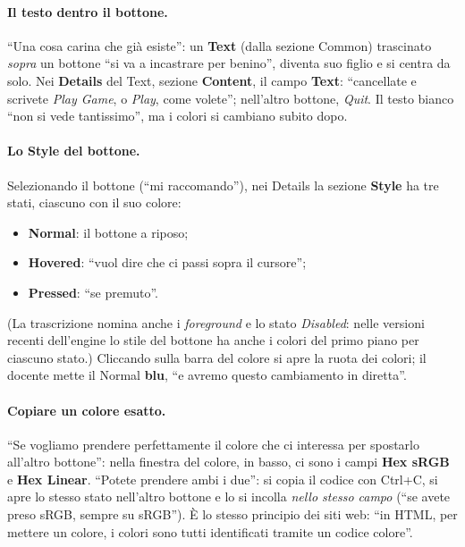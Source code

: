 \paragraph{Il testo dentro il bottone.} ``Una cosa carina che già esiste'': un
\textbf{Text} (dalla sezione Common) trascinato \emph{sopra} un bottone ``si va a incastrare
per benino'', diventa suo figlio e si centra da solo. Nei \textbf{Details} del Text, sezione
\textbf{Content}, il campo \textbf{Text}: ``cancellate e scrivete \emph{Play Game}, o
\emph{Play}, come volete''; nell'altro bottone, \emph{Quit}. Il testo bianco ``non si vede
tantissimo'', ma i colori si cambiano subito dopo.

\paragraph{Lo Style del bottone.} Selezionando il bottone (``mi raccomando''), nei Details
la sezione \textbf{Style} ha tre stati, ciascuno con il suo colore:
\begin{itemize}
  \item \textbf{Normal}: il bottone a riposo;
  \item \textbf{Hovered}: ``vuol dire che ci passi sopra il cursore'';
  \item \textbf{Pressed}: ``se premuto''.
\end{itemize}
(La trascrizione nomina anche i \emph{foreground} e lo stato \emph{Disabled}: nelle
versioni recenti dell'engine lo stile del bottone ha anche i colori del primo piano per
ciascuno stato.) Cliccando sulla barra del colore si apre la ruota dei colori; il docente
mette il Normal \textbf{blu}, ``e avremo questo cambiamento in diretta''.

\paragraph{Copiare un colore esatto.} ``Se vogliamo prendere perfettamente il colore che ci
interessa per spostarlo all'altro bottone'': nella finestra del colore, in basso, ci sono i
campi \textbf{Hex sRGB} e \textbf{Hex Linear}. ``Potete prendere ambi i due'': si copia il
codice con Ctrl+C, si apre lo stesso stato nell'altro bottone e lo si incolla \emph{nello
stesso campo} (``se avete preso sRGB, sempre su sRGB''). È lo stesso principio dei siti
web: ``in HTML, per mettere un colore, i colori sono tutti identificati tramite un codice
colore''.

